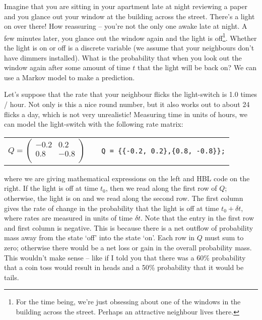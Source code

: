 \documentclass[12pt,twoside,openright]{book}
\begin{document}
Imagine that you are sitting in your apartment late at night reviewing a paper and you glance out your window at the building across the street.  There's a light on over there!  How reassuring -- you're not the only one awake late at night.  A few minutes later, you glance out the window again and the light is off\footnote{For the time being, we're just obsessing about one of the windows in the building across the street.  Perhaps an attractive neighbour lives there.}.  Whether the light is on or off is a discrete variable (we assume that your neighbours don't have dimmers installed).  What is the probability that when you look out the window again after some amount of time $t$ that the light will be back on?  We can use a Markov model to make a prediction.

Let's suppose that the rate that your neighbour flicks the light-switch is 1.0 times / hour.  Not only is this a nice round number, but it also works out to about 24 flicks a day, which is not very unrealistic!   
Measuring time in units of hours, we can model the light-switch with the following rate matrix:

\begin{center}
\begin{tabular}{ccc}
$Q = \left (
\begin{array}{cc}
-0.2 & 0.2\\
0.8 & -0.8\\
\end{array}
\right )$
& 
\hfill
&
{\tt Q = \{\{-0.2, 0.2\},\{0.8, -0.8\}\};}\\
\end{tabular}
\end{center}

\noindent where we are giving mathematical expressions on the left and HBL code on the right.  If the light is off at time $t_0$, then we read along the first row of $Q$; otherwise, the light is on and we read along the second row.  The first column gives the rate of change in the probability that the light is off at time $t_0+\delta t$, where rates are measured in units of time $\delta t$.  Note that the entry in the first row and first column is negative.  This is because there is a net outflow of probability mass away from the state `off' into the state `on'.  Each row in $Q$ must sum to zero; otherwise there would be a net loss or gain in the overall probability mass.  This wouldn't make sense -- like if I told you that there was a 60\% probability that a coin toss would result in heads and a 50\% probability that it would be tails.  
\end{document}
